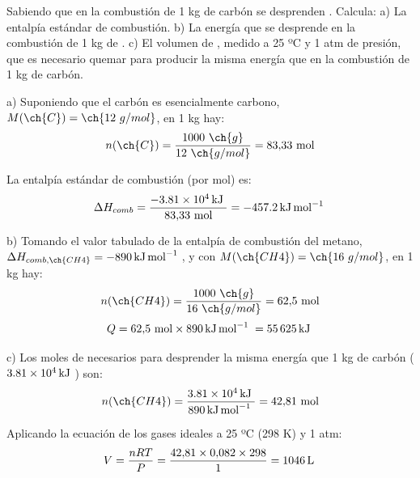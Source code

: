 \begin{exercise}
    Sabiendo que en la combustión de 1 kg de carbón se desprenden . Calcula:
    a) La entalpía estándar de combustión.
    b) La energía que se desprende en la combustión de 1 kg de .
    c) El volumen de , medido a 25 ºC y 1 atm de presión, que es necesario quemar para
    producir la misma energía que en la combustión de 1 kg de carbón.


    \begin{solu}


        a) Suponiendo que el carbón es esencialmente carbono, \(M(\ch{C}) = \ch{12\ g/mol}\), en 1 kg hay:
        \[
            n(\ch{C}) = \frac{1000\ \ch{g}}{12\ \ch{g/mol}} = 83{,}33\ \text{mol}
        \]

        La entalpía estándar de combustión (por mol) es:
        \[
            \entalpia{comb} = \frac{-\energia[kj]{3,81e4}}{83{,}33\ \text{mol}} = \energia[kjmol]{-457,2}
        \]

        b) Tomando el valor tabulado de la entalpía de combustión del metano, \(\entalpia{comb, \ch{CH4}} = \energia[kjmol]{-890}\), y con \(M(\ch{CH4}) = \ch{16\ g/mol}\), en 1 kg hay:
        \[
            n(\ch{CH4}) = \frac{1000\ \ch{g}}{16\ \ch{g/mol}} = 62{,}5\ \text{mol}
        \]
        \[
            Q = 62{,}5\ \text{mol} \times \energia[kjmol]{890} = \energia[kj]{55625}
        \]

        c) Los moles de  necesarios para desprender la misma energía que 1 kg de carbón (\(\energia[kj]{3,81e4}\)) son:
        \[
            n(\ch{CH4}) = \frac{\energia[kj]{3,81e4}}{\energia[kjmol]{890}} = 42{,}81\ \text{mol}
        \]

        Aplicando la ecuación de los gases ideales a 25 ºC (298 K) y 1 atm:
        \[
            V = \frac{nRT}{P} = \frac{42{,}81 \times 0{,}082 \times 298}{1} = \volumen[l]{1046}
        \]
    \end{solu}
\end{exercise}

